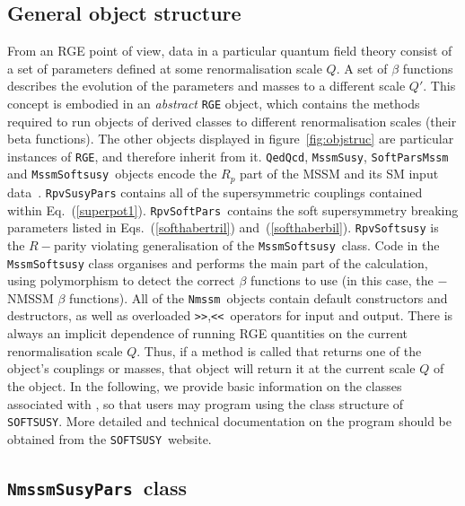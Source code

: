 \documentclass[final,3p,times,pdflatex]{elsarticle}
\def\SOFTSUSY{{\tt SOFTSUSY}}
\def\code#1{\small{\tt #1}\normalsize}
\begin{document}
\subsection{General object structure}

From an RGE point of view, data in a particular quantum field theory 
consist of a set of parameters defined at some
renormalisation scale $Q$. 
A set of $\beta$ functions describes the
evolution of the parameters and masses to a different scale
$Q'$. This concept is embodied in an {\em abstract} \code{RGE}
object, which contains the methods required to run objects of derived
classes to different renormalisation scales (their beta functions). The other
objects 
displayed in figure~\ref{fig:objstruc} are particular instances of
\code{RGE}, and therefore inherit from it. \code{QedQcd}, \code{MssmSusy},
\code{SoftParsMssm} and \code{MssmSoftsusy}~objects encode the $R_p$ part of the
MSSM and its SM input data~\cite{Allanach:2001kg}.
\code{RpvSusyPars} contains all of the supersymmetric  couplings contained
within  Eq.~(\ref{superpot1}). 
\code{RpvSoftPars}~contains the  soft supersymmetry breaking parameters
listed in 
Eqs.~(\ref{softhabertril}) and~(\ref{softhaberbil}). \code{RpvSoftsusy} is
the  $R-$parity violating
generalisation of the \code{MssmSoftsusy}~class. 
Code in
the \code{MssmSoftsusy} class organises and performs the main part of
the calculation, using polymorphism to detect the correct $\beta$ functions to
use (in this case, the $-$NMSSM $\beta$ functions). 
All of the \code{Nmssm}~objects contain default constructors
and destructors, as well as overloaded \code{>>},\code{<<}~operators for input
and output. 
There is always an implicit dependence of running RGE quantities on the
current renormalisation scale $Q$. Thus, if a method is called that returns
one of the object's couplings or masses, that object will return it at the
current scale $Q$ of the object. 
In the following, we provide basic information on the 
classes associated with , so that users may program using the class
structure of \SOFTSUSY\@. More detailed and
technical documentation on the program should be obtained from the
\SOFTSUSY~website. 


\subsection{\code{NmssmSusyPars}~class}
\end{document}
